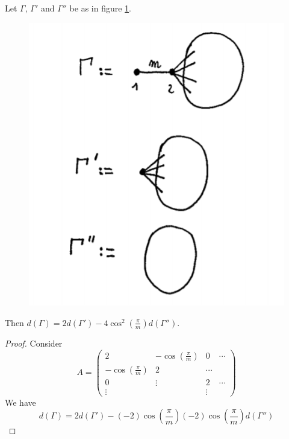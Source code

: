 \begin{lemma}
Let $\Gamma$, $\Gamma '$ and $\Gamma ''$ be as in figure \ref{cours9fig1}.

\begin{figure}[h!]
\centering
\includegraphics[scale=0.6]{cours9fig1.png}
\caption{}
\label{cours9fig1}
\end{figure}

Then $d(\Gamma) = 2 d(\Gamma ') - 4 \cos^2 \left(\frac{\pi}{m} \right) d (\Gamma '')$.
\end{lemma}

\begin{proof}
Consider
\begin{equation}
A = \begin{pmatrix}
2 &-\cos \left(\frac{\pi}{m} \right) &0 &\cdots \\
-\cos \left(\frac{\pi}{m} \right) &2 &\cdots & \\
0 &\vdots & 2 &\cdots \\
\vdots &  & \vdots
\end{pmatrix}
\end{equation} We have
\begin{equation}
d (\Gamma ) =2 d(\Gamma ') - (-2) \cos \left(\frac{\pi}{m} \right) (-2) \cos \left(\frac{\pi}{m} \right)  d (\Gamma '')
\end{equation}
\end{proof}

